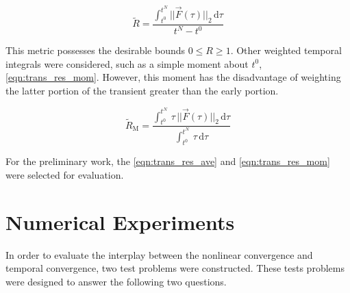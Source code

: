 \begin{equation}
\label{eqn:trans_res_ave}
\tilde{R} = \frac{\int_{t^{0}}^{t^{N}} ||\vec{F}(\tau)||_2 \,\mathrm{d} \tau}{t^{N} - t^{0}}
\end{equation}

This metric possesses the desirable bounds $0 \leq R \geq 1$.
Other weighted temporal integrals were considered, such as a simple moment about $t^{0}$, \eqref{eqn:trans_res_mom}.
However, this moment has the disadvantage of weighting the latter portion of the transient greater than the early portion.

\begin{equation}
\label{eqn:trans_res_mom}
\tilde{R}_{\text{M}} = \frac{\int_{t^{0}}^{t^{N}} \,\tau\,||\vec{F}(\tau)||_2 \,\mathrm{d} \tau}{\int_{t^{0}}^{t^{N}} \,\tau \,\mathrm{d} \tau}
\end{equation}

For the preliminary work, the \eqref{eqn:trans_res_ave} and \eqref{eqn:trans_res_mom} were selected for evaluation.
\section{Numerical Experiments}
\label{sect:numerical_experiments}

In order to evaluate the interplay between the nonlinear convergence and temporal convergence, two test problems were constructed.
These tests problems were designed to answer the following two questions.

